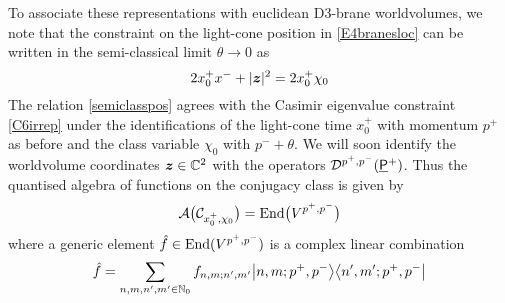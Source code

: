 To associate these representations with euclidean D3-brane worldvolumes, we note
that the constraint on the light-cone position in \eqref{E4branesloc} can be
written in the semi-classical limit $\theta\to0$ as
\begin{equation}
  \label{semiclasspos}
  2x_0^+ x^-+|{{\boldsymbol {z} }}|^2=2x_0^+ \chi_0
\end{equation}
The relation \eqref{semiclasspos} agrees with the Casimir eigenvalue constraint
\eqref{C6irrep} under the identifications of the light-cone time $x_0^+$ with
momentum $p^+$ as before and the class variable $\chi_0$ with $p^-+\theta$. We will
soon identify the worldvolume coordinates ${{\boldsymbol {z} }}\in{\mathbb C}^2$ with the operators
${\mathcal D}^{p^+,p^-}( \underline{\sf P}{}^+)$. Thus the quantised algebra of functions on the conjugacy class
is given by
\begin{equation}
  \label{quantalgD3}
  \mathcal{A}\bigl(\mathcal{C}_{x_0^+,\chi_0}\bigr)=
  {\rm End}\bigl(V^{p^+,p^-}\bigr)
\end{equation}
where a generic element $\hat f\in{\rm End}(V^{p^+,p^-})$ is a complex
linear combination
\begin{equation}
  \label{genlincombD3}
  \hat f=\sum_{n,m,n',m'\in{\mathbb N}_0}f_{n,m;n',m'} \bigl|n,m;p^+,p^-
  \bigr\rangle\bigl\langle n',m';p^+,p^-\bigr|
\end{equation}

